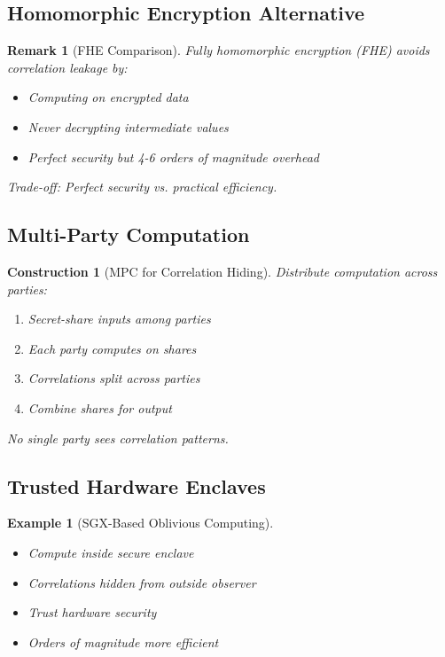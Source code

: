 \documentclass[11pt,final,hidelinks]{article}
\newtheorem{example}[theorem]{Example}
\newtheorem{remark}[theorem]{Remark}
\newtheorem{construction}[theorem]{Construction}
\begin{document}
\subsection{Homomorphic Encryption Alternative}

\begin{remark}[FHE Comparison]
Fully homomorphic encryption (FHE) avoids correlation leakage by:
\begin{itemize}
    \item Computing on encrypted data
    \item Never decrypting intermediate values
    \item Perfect security but 4-6 orders of magnitude overhead
\end{itemize}
Trade-off: Perfect security vs. practical efficiency.
\end{remark}

\subsection{Multi-Party Computation}

\begin{construction}[MPC for Correlation Hiding]
Distribute computation across parties:
\begin{enumerate}
    \item Secret-share inputs among parties
    \item Each party computes on shares
    \item Correlations split across parties
    \item Combine shares for output
\end{enumerate}
No single party sees correlation patterns.
\end{construction}

\subsection{Trusted Hardware Enclaves}

\begin{example}[SGX-Based Oblivious Computing]
\begin{itemize}
    \item Compute inside secure enclave
    \item Correlations hidden from outside observer
    \item Trust hardware security
    \item Orders of magnitude more efficient
\end{itemize}
\end{example}
\end{document}
